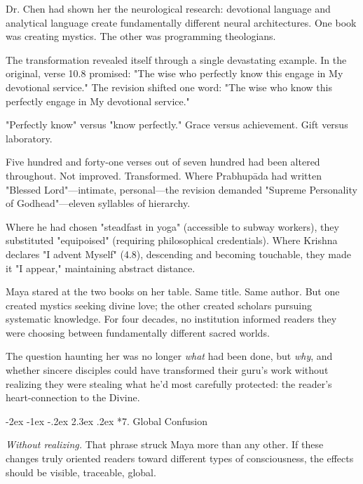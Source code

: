 \documentclass[12pt,twoside]{book}
\makeatletter
\renewcommand\section{\@startsection{section}{1}{\z@}%
{-3.5ex \@plus -1ex \@minus -.2ex}%
{2.3ex \@plus.2ex}%
{\normalfont\Large\bfseries}}
\let\oldsection\section
\renewcommand{\section}[1]{\needspace{4\baselineskip}\oldsection{#1}}
\def\cleardoublepage{\clearpage\if@twoside \ifodd\c@page\else\hbox{}\thispagestyle{empty}\newpage\if@twocolumn\hbox{}\newpage\fi\fi\fi}
\renewcommand\section{\@startsection{section}{1}{\z@}%
{-2ex \@plus -1ex \@minus -.2ex}%
{2.3ex \@plus.2ex}%
{\normalfont\Large\bfseries}}
\makeatother
\begin{document}
Dr. Chen had shown her the neurological research: devotional language and analytical language create fundamentally different neural architectures. One book was creating mystics. The other was programming theologians.

The transformation revealed itself through a single devastating example. In the original, verse 10.8 promised: "The wise who perfectly know this engage in My devotional service." The revision shifted one word: "The wise who know this perfectly engage in My devotional service."

"Perfectly know" versus "know perfectly." Grace versus achievement. Gift versus laboratory.

Five hundred and forty-one verses out of seven hundred had been altered throughout. Not improved. Transformed. Where Prabhupāda had written "Blessed Lord"—intimate, personal—the revision demanded "Supreme Personality of Godhead"—eleven syllables of hierarchy.

Where he had chosen "steadfast in yoga" (accessible to subway workers), they substituted "equipoised" (requiring philosophical credentials). Where Krishna declares "I advent Myself" (4.8), descending and becoming touchable, they made it "I appear," maintaining abstract distance.

Maya stared at the two books on her table. Same title. Same author. But one created mystics seeking divine love; the other created scholars pursuing systematic knowledge. For four decades, no institution informed readers they were choosing between fundamentally different sacred worlds.

The question haunting her was no longer \emph{what} had been done, but \emph{why}, and whether sincere disciples could have transformed their guru's work without realizing they were stealing what he'd most carefully protected: the reader's heart-connection to the Divine.

\cleardoublepage
\vspace*{0.20\textheight}
\section*{7. Global Confusion}
\thispagestyle{chapterpage}

\vspace{0.1cm}

\normalfont\justifying
\emph{Without realizing.} That phrase struck Maya more than any other. If these changes truly oriented readers toward different types of consciousness, the effects should be visible, traceable, global.
\end{document}

